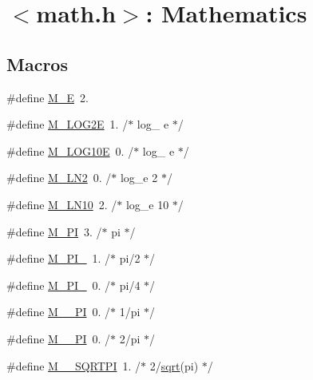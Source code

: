 \hypertarget{group__avr__math}{}\section{$<$math.\+h$>$\+: Mathematics}
\label{group__avr__math}
\subsection*{Macros}
\begin{DoxyCompactItemize}
\item 
\#define \hyperlink{group__avr__math_ga9bf5d952c5c93c70f9e66c9794d406c9}{M\+\_\+E}~2.
\item 
\#define \hyperlink{group__avr__math_gac5c747ee5bcbe892875672a0b9d8171c}{M\+\_\+\+L\+O\+G2E}~1.	/$\ast$ log\+\_ e $\ast$/
\item 
\#define \hyperlink{group__avr__math_ga9ed2b5582226f3896424ff6d2a3ebb14}{M\+\_\+\+L\+O\+G10E}~0.	/$\ast$ log\+\_ e $\ast$/
\item 
\#define \hyperlink{group__avr__math_ga92428112a5d24721208748774a4f23e6}{M\+\_\+\+L\+N2}~0.	/$\ast$ log\+\_\+e 2 $\ast$/
\item 
\#define \hyperlink{group__avr__math_ga0a53871497a155afe91424c28a8ec3c4}{M\+\_\+\+L\+N10}~2.	/$\ast$ log\+\_\+e 10 $\ast$/
\item 
\#define \hyperlink{group__avr__math_gae71449b1cc6e6250b91f539153a7a0d3}{M\+\_\+\+PI}~3.	/$\ast$ pi $\ast$/
\item 
\#define \hyperlink{group__avr__math_ga958e4508ed28ee5cc04249144312c15f}{M\+\_\+\+P\+I\+\_}~1.	/$\ast$ pi/2 $\ast$/
\item 
\#define \hyperlink{group__avr__math_gaeb24420b096a677f3a2dc5a72b36bf22}{M\+\_\+\+P\+I\+\_}~0.	/$\ast$ pi/4 $\ast$/
\item 
\#define \hyperlink{group__avr__math_ga08dfac3cca9601a02fc88356cc078e1d}{M\+\_\+\_\+\+PI}~0.	/$\ast$ 1/pi $\ast$/
\item 
\#define \hyperlink{group__avr__math_ga97f6d6514d3d3dd50c3a2a6d622673db}{M\+\_\+\_\+\+PI}~0.	/$\ast$ 2/pi $\ast$/
\item 
\#define \hyperlink{group__avr__math_ga631ff334c4a1a6db2e8a7ff4acbe48a5}{M\+\_\+\_\+\+S\+Q\+R\+T\+PI}~1.	/$\ast$ 2/\hyperlink{group__avr__math_gaac21324d984f0af0fb87a613efb69d77}{sqrt}(pi) $\ast$/

\end{DoxyCompactItemize}
